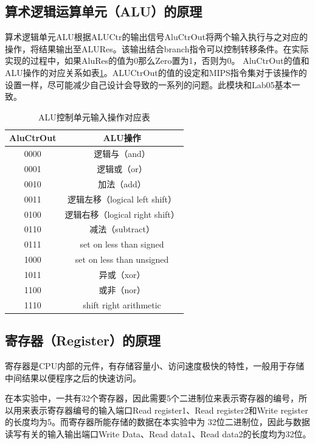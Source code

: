 \subsection{算术逻辑运算单元（ALU）的原理}

算术逻辑单元ALU根据ALUCtr的输出信号AluCtrOut将两个输入执行与之对应的操作，将结果输出至ALURes。该输出结合branch指令可以控制转移条件。在实际实现的过程中，如果AluRes的值为0那么Zero置为1，否则为0。
AluCtrOut的值和ALU操作的对应关系如表\ref{7}。ALUCtrOut的值的设定和MIPS指令集对于该操作的设置一样，尽可能减少自己设计会导致的一系列的问题。此模块和Lab05基本一致。

\begin{table}[H]
    \centering
    \begin{tabular}{c|c}
    \hline
        AluCtrOut & ALU操作 \\
\hline
        0000 & 逻辑与（and） \\
        0001 & 逻辑或（or） \\
        0010 & 加法（add） \\
        0011 & 逻辑左移（logical left shift） \\
        0100 & 逻辑右移（logical right shift） \\ 
        0110 & 减法（subtract） \\
        0111 & set on less than signed \\
        1000 & set on less than unsigned \\
        1011 & 异或（xor） \\
        1100 & 或非（nor） \\
        1110 & shift right arithmetic \\

        \hline
        
    \end{tabular}
    \caption{ALU控制单元输入操作对应表}
    \label{7}
\end{table}

\subsection{寄存器（Register）的原理}

寄存器是CPU内部的元件，有存储容量小、访问速度极快的特性，一般用于存储中间结果以便程序之后的快速访问。

在本实验中，一共有32个寄存器，因此需要5个二进制位来表示寄存器的编号，所以用来表示寄存器编号的输入端口Read register1、Read register2和Write register的长度均为5。而寄存器所能存储的数据在本实验中为
32位二进制位，因此与数据读写有关的输入输出端口Write Data、Read data1、Read data2的长度均为32位。

